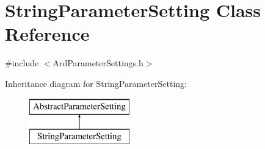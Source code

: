 \hypertarget{class_string_parameter_setting}{\section{String\-Parameter\-Setting Class Reference}
\label{class_string_parameter_setting}
}


{\ttfamily \#include $<$Ard\-Parameter\-Settings.\-h$>$}

Inheritance diagram for String\-Parameter\-Setting\-:\begin{figure}[H]
\begin{center}
\leavevmode
\includegraphics[height=2.000000cm]{class_string_parameter_setting}
\end{center}
\end{figure}
